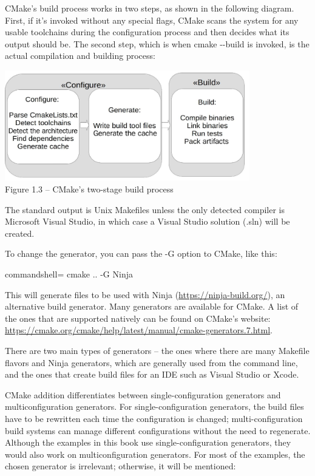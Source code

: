 
CMake's build process works in two steps, as shown in the following diagram. First, if it's invoked without any special flags, CMake scans the system for any usable toolchains during the configuration process and then decides what its output should be. The second step, which is when cmake -{}-build is invoked, is the actual compilation and building process:

\begin{center}
\includegraphics[width=0.8\textwidth]{content/1/chapter1/images/3.jpg}\\
Figure 1.3 – CMake's two-stage build process
\end{center}

The standard output is Unix Makefiles unless the only detected compiler is Microsoft Visual Studio, in which case a Visual Studio solution (.sln) will be created. 

To change the generator, you can pass the -G option to CMake, like this:

\begin{tcblisting}{commandshell={}}
cmake .. -G Ninja
\end{tcblisting}

This will generate files to be used with Ninja (\url{https://ninja-build.org/}), an alternative build generator. Many generators are available for CMake. A list of the ones that are supported natively can be found on CMake's website: \url{https://cmake.org/cmake/help/latest/manual/cmake-generators.7.html}.

There are two main types of generators – the ones where there are many Makefile flavors and Ninja generators, which are generally used from the command line, and the ones that create build files for an IDE such as Visual Studio or Xcode.

CMake addition differentiates between single-configuration generators and multiconfiguration generators. For single-configuration generators, the build files have to be rewritten each time the configuration is changed; multi-configuration build systems can manage different configurations without the need to regenerate. Although the examples in this book use single-configuration generators, they would also work on multiconfiguration generators. For most of the examples, the chosen generator is irrelevant; otherwise, it will be mentioned:

